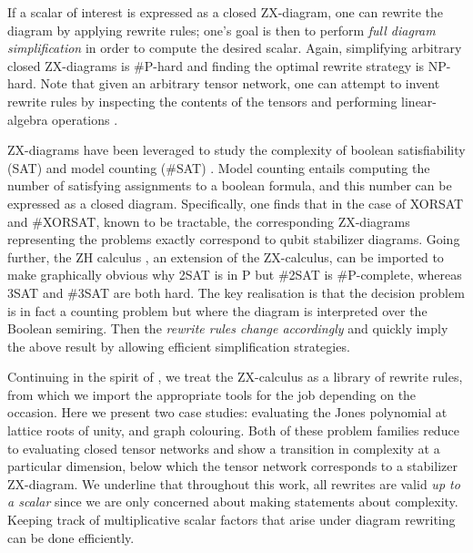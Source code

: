 If a scalar of interest is expressed as a closed ZX-diagram,
one can rewrite the diagram by applying rewrite rules; one's goal is then to perform \emph{full diagram simplification} in order to compute the desired scalar.
Again, simplifying arbitrary closed ZX-diagrams is \#P-hard and finding the optimal rewrite strategy is NP-hard.
Note that
given an arbitrary tensor network, one can attempt to invent rewrite rules by inspecting the contents of the tensors and performing linear-algebra operations \cite{gray2020hyperoptimized}.


ZX-diagrams have been leveraged to study the complexity of boolean satisfiability (SAT) and model counting (\#SAT) \cite{debeaudrap2020tensor}.
Model counting entails computing the number of satisfying assignments to a boolean formula,
and this number can be expressed as a closed diagram.
Specifically, one finds that in the case of XORSAT and \#XORSAT,
known to be tractable,
the corresponding ZX-diagrams representing the problems exactly correspond to qubit stabilizer diagrams.
Going further, the ZH calculus \cite{backens2018zh}, an extension of the ZX-calculus, can be imported to make graphically obvious
why 2SAT is in P but \#2SAT is \#P-complete, whereas 3SAT and \#3SAT are both hard.
The key realisation is that the decision problem is in fact a counting problem
but where the diagram is interpreted over the Boolean semiring.
Then the \emph{rewrite rules change accordingly} and quickly imply the above result by allowing efficient simplification strategies.

Continuing in the spirit of \cite{debeaudrap2020tensor}, we treat the ZX-calculus as a library of rewrite rules, from which we import the appropriate tools for the job depending on the occasion.
Here we present two case studies: evaluating the Jones polynomial at lattice roots of unity, and graph colouring.
Both of these problem families reduce to evaluating
closed tensor networks and show a transition in complexity
at a particular dimension, below which the tensor network corresponds to a stabilizer ZX-diagram.
We underline that throughout this work, all rewrites are valid
\emph{up to a scalar}
since we are only concerned about making statements about complexity.
Keeping track of multiplicative scalar factors that arise under diagram rewriting can be done efficiently.
